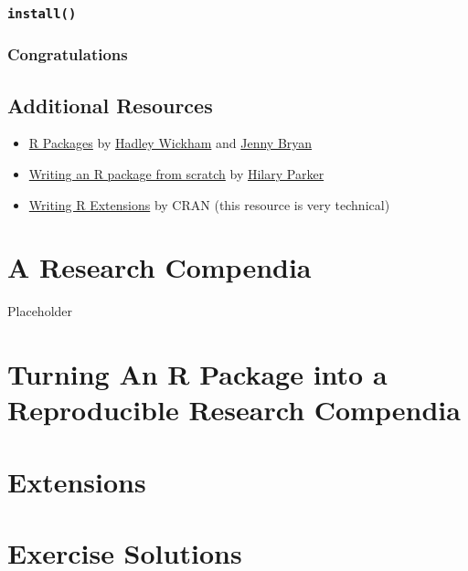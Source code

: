 \documentclass[
]{book}
\providecommand{\tightlist}{%
  \setlength{\itemsep}{0pt}\setlength{\parskip}{0pt}}
\begin{document}
\hypertarget{install}{%
\subsection{\texorpdfstring{\texttt{install()}}{install()}}\label{install}}

\hypertarget{congratulations}{%
\subsection{Congratulations}\label{congratulations}}

\hypertarget{additional-resources}{%
\section{Additional Resources}\label{additional-resources}}

\begin{itemize}
\tightlist
\item
  \href{https://r-pkgs.org/index.html}{R Packages} by \href{http://hadley.nz/}{Hadley Wickham} and \href{https://jennybryan.org/}{Jenny Bryan}
\item
  \href{https://hilaryparker.com/2014/04/29/writing-an-r-package-from-scratch/}{Writing an R package from scratch} by \href{https://hilaryparker.com/}{Hilary Parker}
\item
  \href{https://cran.r-project.org/doc/manuals/r-release/R-exts.html}{Writing R Extensions} by CRAN (this resource is very technical)
\end{itemize}

\hypertarget{a-research-compendia}{%
\chapter{A Research Compendia}\label{a-research-compendia}}

Placeholder

\hypertarget{your-compendia}{%
\chapter{Turning An R Package into a Reproducible Research Compendia}\label{your-compendia}}

\hypertarget{extensions}{%
\chapter{Extensions}\label{extensions}}

\hypertarget{exercise-solutions}{%
\chapter{Exercise Solutions}\label{exercise-solutions}}
\end{document}
